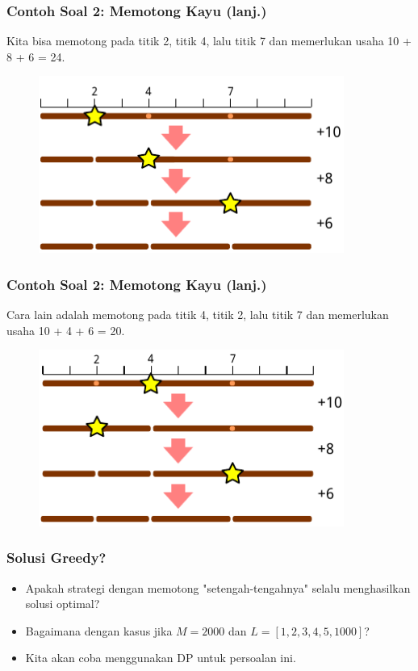 \begin{frame}
\frametitle{Contoh Soal 2: Memotong Kayu (lanj.)}
Kita bisa memotong pada titik 2, titik 4, lalu titik 7 dan memerlukan usaha 10 + 8 + 6 = 24.
\begin{figure}
  \includegraphics[width=10cm]{asset/cutting-stick-2.pdf}
\end{figure}
\end{frame}

\begin{frame}
\frametitle{Contoh Soal 2: Memotong Kayu (lanj.)}
Cara lain adalah memotong pada titik 4, titik 2, lalu titik 7 dan memerlukan usaha 10 + 4 + 6 = 20.
\begin{figure}
  \includegraphics[width=10cm]{asset/cutting-stick-3.pdf}
\end{figure}
\end{frame}

\begin{frame}
\frametitle{Solusi Greedy?}
\begin{itemize}
  \item Apakah strategi \fGreedy dengan memotong "setengah-tengahnya" selalu menghasilkan solusi optimal?
  \item Bagaimana dengan kasus jika $M = 2000$ dan $L = [1, 2, 3, 4, 5, 1000]$?
  \item Kita akan coba menggunakan DP untuk persoalan ini.
\end{itemize}
\end{frame}

